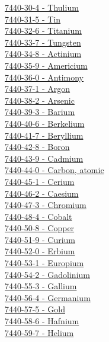 \documentclass{book}
\begin{document}
\begin{multicols}{2}
\hyperref[sec:elem-thulium]{7440-30-4 - Thulium}\\
\hyperref[sec:elem-tin]{7440-31-5 - Tin}\\
\hyperref[sec:elem-titanium]{7440-32-6 - Titanium}\\
\hyperref[sec:elem-tungsten]{7440-33-7 - Tungsten}\\
\hyperref[sec:elem-actinium]{7440-34-8 - Actinium}\\
\hyperref[sec:elem-americium]{7440-35-9 - Americium}\\
\hyperref[sec:elem-antimony]{7440-36-0 - Antimony}\\
\hyperref[sec:elem-argon]{7440-37-1 - Argon}\\
\hyperref[sec:elem-arsenic]{7440-38-2 - Arsenic}\\
\hyperref[sec:elem-barium]{7440-39-3 - Barium}\\
\hyperref[sec:elem-berkelium]{7440-40-6 - Berkelium}\\
\hyperref[sec:elem-beryllium]{7440-41-7 - Beryllium}\\
\hyperref[sec:elem-boron]{7440-42-8 - Boron}\\
\hyperref[sec:elem-cadmium]{7440-43-9 - Cadmium}\\
\hyperref[sec:elem-carbon]{7440-44-0 - Carbon, atomic}\\
\hyperref[sec:elem-cerium]{7440-45-1 - Cerium}\\
\hyperref[sec:elem-caesium]{7440-46-2 - Caesium}\\
\hyperref[sec:elem-chromium]{7440-47-3 - Chromium}\\
\hyperref[sec:elem-cobalt]{7440-48-4 - Cobalt}\\
\hyperref[sec:elem-copper]{7440-50-8 - Copper}\\
\hyperref[sec:elem-curium]{7440-51-9 - Curium}\\
\hyperref[sec:elem-erbium]{7440-52-0 - Erbium}\\
\hyperref[sec:elem-europium]{7440-53-1 - Europium}\\
\hyperref[sec:elem-gadolinium]{7440-54-2 - Gadolinium}\\
\hyperref[sec:elem-gallium]{7440-55-3 - Gallium}\\
\hyperref[sec:elem-germanium]{7440-56-4 - Germanium}\\
\hyperref[sec:elem-gold]{7440-57-5 - Gold}\\
\hyperref[sec:elem-hafnium]{7440-58-6 - Hafnium}\\
\hyperref[sec:elem-helium]{7440-59-7 - Helium}\\

\end{multicols}
\end{document}

